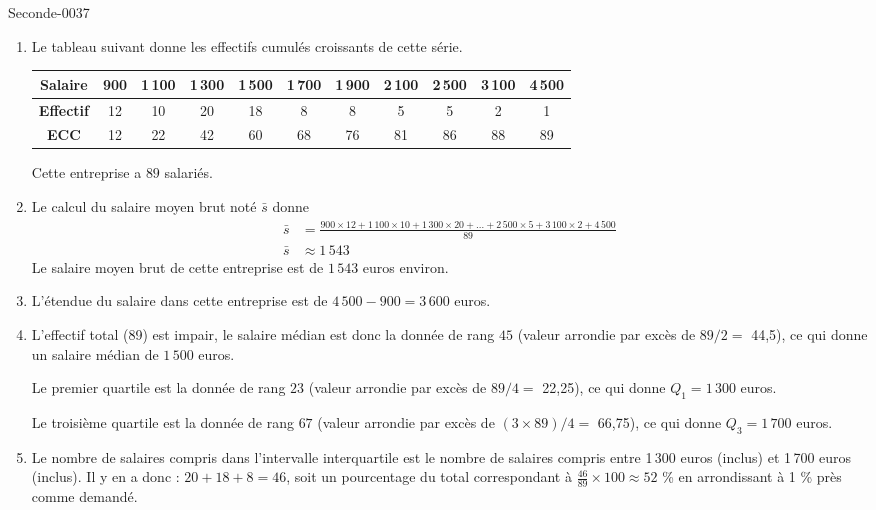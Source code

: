 
\begin{corrige}{Seconde-0037}


\begin{enumerate}

\item Le tableau suivant donne les effectifs cumulés croissants de cette série.  

  \begin{tabular}{|c||c|c|c|c|c|c|c|c|c|c|}
    \hline 
    \textbf{Salaire} &900&1\,100&1\,300&1\,500&1\,700&1\,900&2\,100&2\,500&3\,100&4\,500\\
    \hline 
    \textbf{Effectif} &12&10&20&18&8&8&5&5&2&1\\
    \hline 
    \textbf{ECC} &12&22&42&60&68&76&81&86&88&89\\
    \hline
  \end{tabular}
  
  \medskip
  Cette entreprise a $89$ salariés.
  \smallskip

\item Le calcul du salaire moyen brut noté $\bar{s}$ donne
  \begin{align*}
    \bar{s} &= 
    \frac{900\times 12 + 1\,100\times 10 + 1\,300\times 20 + \ldots+
      2\,500\times 5 + 3\,100\times 2 + 4\,500}{89}\\
    \bar{s} &\approx 1\,543
  \end{align*}
  Le salaire moyen brut de cette entreprise est de $1\,543$ euros environ.
  \smallskip

\item L'étendue du salaire dans cette entreprise est de
  $4\,500-900=3\,600$ euros.

\item L'effectif total (89) est impair, le salaire médian est donc la
  donnée de rang $45$ (valeur arrondie par excès de $89 / 2 = $ 44,5),
  ce qui donne un salaire médian de $1\,500$ euros.

  Le premier quartile est la donnée de rang $23$ (valeur arrondie par
  excès de $89 / 4 =$ 22,25), ce qui donne $Q_1 = 1\,300$ euros.

  Le troisième quartile est la donnée de rang $67$ (valeur arrondie
  par excès de $(3\times89) / 4 = $ 66,75), ce qui donne $Q_3 = 1\,700$
  euros.

\item Le nombre de salaires compris dans l'intervalle interquartile
  est le nombre de salaires compris entre 1\,300 euros (inclus) et
  1\,700 euros (inclus). Il y en a donc : $20+18+8=46$, soit un
  pourcentage du total correspondant à $\frac{46}{89}\times100\approx
  52$ \% en arrondissant à 1 \% près comme demandé.


\end{enumerate}
\end{corrige}

